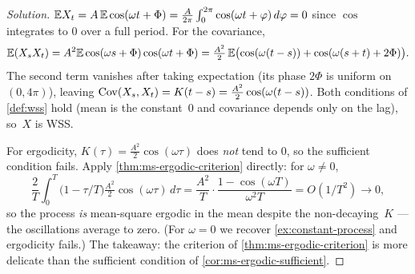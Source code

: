 \begin{proof}[Solution]
$\mathbb{E} X_t = A\, \mathbb{E} \cos(\omega t + \Phi) = \frac{A}{2\pi} \int_0^{2\pi} \cos(\omega t + \varphi)\, d\varphi = 0$
since $\cos$ integrates to $0$ over a full period. For the
covariance,
\[
  \mathbb{E} (X_s X_t) = A^2 \mathbb{E} \cos(\omega s + \Phi)\cos(\omega t + \Phi) = \tfrac{A^2}{2}\, \mathbb{E}\bigl(\cos(\omega(t - s)) + \cos(\omega(s + t) + 2\Phi)\bigr).
\]
The second term vanishes after taking expectation (its phase
$2\Phi$ is uniform on $(0, 4\pi)$), leaving
$\operatorname{Cov}(X_s, X_t) = K(t - s) = \frac{A^2}{2} \cos(\omega(t - s))$.
Both conditions of \cref{def:wss} hold (mean is the constant~$0$
and covariance depends only on the lag), so~$X$ is WSS.

For ergodicity, $K(\tau) = \frac{A^2}{2} \cos(\omega \tau)$ does
\emph{not} tend to $0$, so the sufficient condition fails. Apply
\cref{thm:ms-ergodic-criterion} directly: for $\omega \neq 0$,
\[
  \frac{2}{T} \int_0^T \bigl(1 - \tau/T\bigr) \tfrac{A^2}{2} \cos(\omega \tau)\, d\tau = \frac{A^2}{T} \cdot \frac{1 - \cos(\omega T)}{\omega^2 T} = O(1/T^2) \to 0,
\]
so the process \emph{is} mean-square ergodic in the mean despite
the non-decaying~$K$ — the oscillations average to zero. (For
$\omega = 0$ we recover \cref{ex:constant-process} and ergodicity
fails.) The takeaway: the criterion of
\cref{thm:ms-ergodic-criterion} is more delicate than the
sufficient condition of \cref{cor:ms-ergodic-sufficient}.
\end{proof}
